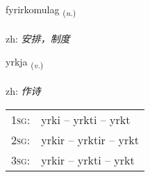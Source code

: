 \documentclass[frontgrid, backgrid]{flacards}\usepackage[]{graphicx}\usepackage[]{color}
\begin{document}
\renewcommand{\flhead}{\vskip5pt \fboxsep=0pt {\small\bfseries\footnotesize Nafnorð | 名词}}
\renewcommand{\fcfoot}{\vskip5pt \fboxsep=0pt \hspace{2pt}{\small\bfseries\footnotesize 2K}}

\renewcommand{\blhead}{\vskip5pt {\small\bfseries\footnotesize Nafnorð | 名词 }}
\renewcommand{\bcfoot}{\vskip5pt \hspace{2pt}{\small\bfseries\footnotesize 2K}}


{fyrirkomulag \small{\textsubscript{(\textit{n.})}} \\[1ex] %
 \\
zh: \emph{安排，制度} \\  [2ex]
\renewcommand*{\arraystretch}{0.8}
}

\renewcommand{\flhead}{\vskip5pt \fboxsep=0pt {\small\bfseries\footnotesize Sagnorð | 动词}}
\renewcommand{\fcfoot}{\vskip5pt \fboxsep=0pt \hspace{2pt}{\small\bfseries\footnotesize 2K}}

\renewcommand{\blhead}{\vskip5pt {\small\bfseries\footnotesize Sagnorð | 动词 }}
\renewcommand{\bcfoot}{\vskip5pt \hspace{2pt}{\small\bfseries\footnotesize 2K}}


{yrkja \small{\textsubscript{(\textit{v.})}} \\[1ex] %
\textphonetic{[ɪr̥ca]} \\
zh: \emph{作诗} \\  [2ex]
\renewcommand*{\arraystretch}{0.8}
\begin{tabular}{p{1cm}l}
\textsc{1sg}: & yrki -- yrkti -- yrkt \\ 
\textsc{2sg}: & yrkir -- yrktir -- yrkt \\ 
\textsc{3sg}: & yrkir -- yrkti -- yrkt \\ 
\end{tabular}
}
\end{document}
